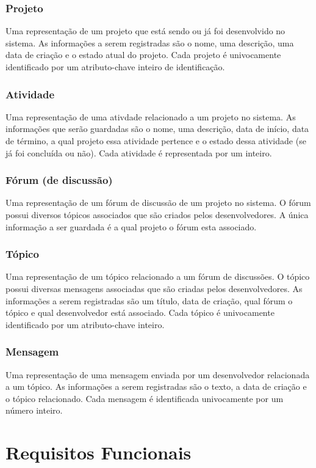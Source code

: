 \documentclass{article}
\begin{document}
		\subsubsection{Projeto}
		Uma representação de um projeto que está sendo ou já foi desenvolvido no sistema. As informações a serem registradas são o nome, uma descrição, uma data de criação e o estado atual do projeto. Cada projeto é univocamente identificado por um atributo-chave inteiro de identificação.

		\subsubsection{Atividade}
		Uma representação de uma ativdade relacionado a um projeto no sistema. As informações que serão guardadas são o nome, uma descrição, data de início, data de término, a qual projeto essa atividade pertence e o estado dessa atividade (se já foi concluída ou não). Cada atividade é representada por um inteiro.

		\subsubsection{Fórum (de discussão)}
		Uma representação de um fórum de discussão de um projeto no sistema. O fórum possui diversos tópicos associados que são criados pelos desenvolvedores. A única informação a ser guardada é a qual projeto o fórum esta associado.

		\subsubsection{Tópico}
		Uma representação de um tópico relacionado a um fórum de discussões. O tópico possui diversas mensagens associadas que são criadas pelos desenvolvedores. As informações a serem registradas são um título, data de criação, qual fórum o tópico e qual desenvolvedor está associado. Cada tópico é univocamente identificado por um atributo-chave inteiro.

		\subsubsection{Mensagem}
		Uma representação de uma mensagem enviada por um desenvolvedor relacionada a um tópico. As informações a serem registradas são o texto, a data de criação e o tópico relacionado. Cada mensagem é identificada univocamente por um número inteiro.

\section{Requisitos Funcionais}
\end{document}
